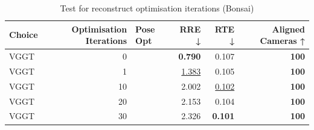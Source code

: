 \begin{table}[H]
\caption{Test for reconstruct optimisation iterations (Bonsai)}
\label{tab:99_optimisation_iterations_bonsai}
\begin{tabular}{lrlrrr}
\toprule
Choice & Optimisation Iterations & Pose Opt & RRE ↓ & RTE ↓ & Aligned Cameras ↑ \\
\midrule
VGGT & 0 &  & \textbf{0.790} & 0.107 & \textbf{100} \\
VGGT & 1 &  & \underline{1.383} & 0.105 & \textbf{100} \\
VGGT & 10 &  & 2.002 & \underline{0.102} & \textbf{100} \\
VGGT & 20 &  & 2.153 & 0.104 & \textbf{100} \\
VGGT & 30 &  & 2.326 & \textbf{0.101} & \textbf{100} \\
\bottomrule
\end{tabular}
\end{table}
